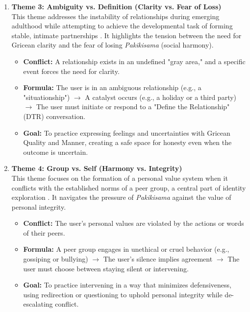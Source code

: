 \begin{enumerate}
    \item \textbf{Theme 3: Ambiguity vs. Definition (Clarity vs. Fear of Loss)} \\
    This theme addresses the instability of relationships during emerging adulthood \cite{arnett_emerging_2000} while attempting to achieve the developmental task of forming stable, intimate partnerships \cite{havighurst_developmental_1948}. It highlights the tension between the need for Gricean clarity and the fear of losing \textit{Pakikisama} (social harmony).
    \begin{itemize}
    \item \textbf{Conflict:} A relationship exists in an undefined "gray area," and a specific event forces the need for clarity.
    \item \textbf{Formula:} The user is in an ambiguous relationship (e.g., a "situationship") $\rightarrow$ A catalyst occurs (e.g., a holiday or a third party) $\rightarrow$ The user must initiate or respond to a "Define the Relationship" (DTR) conversation.
    \item \textbf{Goal:} To practice expressing feelings and uncertainties with Gricean Quality and Manner, creating a safe space for honesty even when the outcome is uncertain.
    \end{itemize}

    \item \textbf{Theme 4: Group vs. Self (Harmony vs. Integrity)} \\
    This theme focuses on the formation of a personal value system \cite{havighurst_developmental_1948} when it conflicts with the established norms of a peer group, a central part of identity exploration \cite{arnett_emerging_2000}. It navigates the pressure of \textit{Pakikisama} against the value of personal integrity.
    \begin{itemize}
    \item \textbf{Conflict:} The user’s personal values are violated by the actions or words of their peers.
    \item \textbf{Formula:} A peer group engages in unethical or cruel behavior (e.g., gossiping or bullying) $\rightarrow$ The user’s silence implies agreement $\rightarrow$ The user must choose between staying silent or intervening.
    \item \textbf{Goal:} To practice intervening in a way that minimizes defensiveness, using redirection or questioning to uphold personal integrity while de-escalating conflict.
    \end{itemize}
\end{enumerate}

